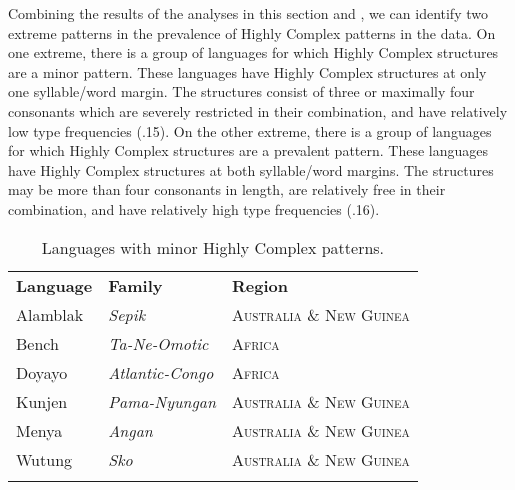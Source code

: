   Combining the results of the analyses in this section and , we can identify two extreme patterns in the prevalence of Highly Complex patterns in the data. On one extreme, there is a group of languages for which Highly Complex structures are a minor pattern. These languages have Highly Complex structures at only one syllable/word margin. The structures consist of three or maximally four consonants which are severely restricted in their combination, and have relatively low type frequencies (.15). On the other extreme, there is a group of languages for which Highly Complex structures are a prevalent pattern. These languages have Highly Complex structures at both syllable/word margins. The structures may be more than four consonants in length, are relatively free in their combination, and have relatively high type frequencies (.16).






\begin{table}
\begin{tabularx}{\textwidth}{XXX}
\lsptoprule

\textbf{Language} & \textbf{Family} & \textbf{Region}\\
Alamblak & \textit{Sepik} & \textsc{Australia} \textsc{\&} \textsc{New} \textsc{Guinea}\\
Bench & \textit{Ta-Ne-Omotic} & \textsc{Africa}\\
Doyayo & \textit{Atlantic-Congo} & \textsc{Africa}\\
Kunjen & \textit{Pama-Nyungan} & \textsc{Australia} \textsc{\&} \textsc{New} \textsc{Guinea}\\
Menya & \textit{Angan} & \textsc{Australia} \textsc{\&} \textsc{New} \textsc{Guinea}\\
Wutung & \textit{Sko} & \textsc{Australia} \textsc{\&} \textsc{New} \textsc{Guinea}\\
\lspbottomrule
\end{tabularx}
\caption{\label{3.15}Languages with minor Highly Complex patterns.}
\end{table}







